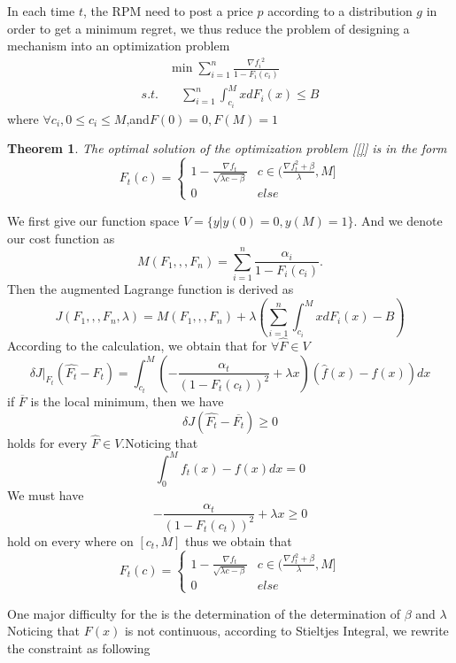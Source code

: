 \documentclass[10pt,conference,compsocconf,letterpaper]{IEEEtran}
\newtheorem{theorem}{Theorem}
\begin{document}
In each time $t$, the RPM need to post a price $p$ according to a distribution $g$ in order to get a minimum regret, we thus reduce the problem of designing a mechanism into an optimization problem
\begin{equation}
\begin{aligned}
&\min \sum_{i=1}^n \frac{{\nabla f_i}^2}{1-F_i(c_i)}\\
s.t. &\quad \sum_{i=1}^n\int_{c_i}^MxdF_i(x)\leq B
\end{aligned}
\end{equation}
where $\forall c_i,0\leq c_i\leq M$,and$F(0)=0,F(M)=1$
\begin{theorem}
The optimal solution of the optimization problem [\ref{}] is in the form 
\begin{equation}
F_t(c)=\begin{cases}
  1-\frac{\nabla f_t}{\sqrt{\lambda c-\beta}} &c\in(\frac{\nabla f_t^2+\beta}{\lambda},M]  \\
  0 & else 
\end{cases}
\end{equation}
\end{theorem}
\begin{IEEEproof}
We first give our function space $V=\{y|y(0)=0,y(M)=1\}$. And we denote our cost function as
\[M(F_1,,,F_n)= \sum_{i=1}^n \frac{\alpha_i}{1-F_i(c_i)}.\]
Then the augmented Lagrange function is derived as
\[J(F_1,,,F_n,\lambda)=M(F_1,,,F_n)+\lambda( \sum_{i=1}^n\int_{c_i}^MxdF_i(x)-B) \]
According to the calculation, we obtain that for $\forall \hat{F}\in V$
\[\delta J|_{F_t}(\hat{F_t}-F_t)=\int_{c_t}^M(-\frac{\alpha_t}{(1-F_t(c_t))^2}+\lambda x)(\hat{f}(x)-f(x))dx\]
if $\overline{F}$ is the local minimum, then we have
\[\delta J(\hat{F_t}-\overline{F_t})\geq 0\]
holds for every $\hat{F}\in V$.Noticing that
\[\int_0^Mf_t(x)-f(x)dx=0\]
We must have 
\[-\frac{\alpha_t}{(1-F_t(c_t))^2}+\lambda x\geq 0\]
hold on every where on $[c_t,M]$
thus we obtain that
\begin{equation}
F_t(c)=\begin{cases}
  1-\frac{\nabla f_t}{\sqrt{\lambda c-\beta}} &c\in(\frac{\nabla f_t^2+\beta}{\lambda},M]  \\
  0 & else 
\end{cases}
\end{equation}
\end{IEEEproof}
One major difficulty for the  is the determination of the determination of $\beta$ and $\lambda$
Noticing that $F(x)$ is not continuous, according to Stieltjes Integral, we rewrite the constraint as following
\end{document}
